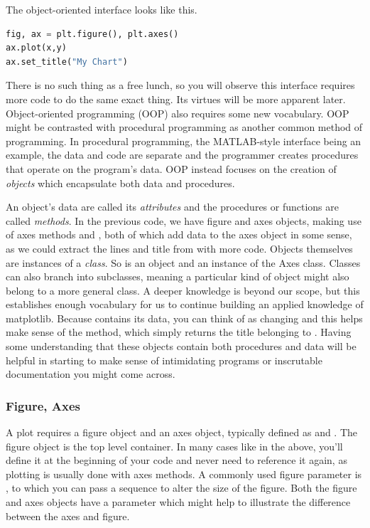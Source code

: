 The object-oriented interface looks like this. 

\begin{lstlisting}[language = Python]
fig, ax = plt.figure(), plt.axes()
ax.plot(x,y)
ax.set_title("My Chart")
\end{lstlisting}

There is no such thing as a free lunch, so you will observe this interface requires more code to do the same exact thing. Its virtues will be more apparent later. Object-oriented programming (OOP) also requires some new vocabulary. OOP might be contrasted with procedural programming as another common method of programming. In procedural programming, the MATLAB-style interface being an example, the data and code are separate and the programmer creates procedures that operate on the program's data. OOP instead focuses on the creation of \emph{objects} which encapsulate both data and procedures. 

An object's data are called its \emph{attributes} and the procedures or functions are called \emph{methods}. In the previous code, we have figure and axes objects, making use of axes methods  and , both of which add data to the axes object in some sense, as we could extract the lines and title from  with more code. Objects themselves are instances of a \emph{class}. So  is an object and an instance of the Axes class. Classes can also branch into subclasses, meaning a particular kind of object might also belong to a more general class. A deeper knowledge is beyond our scope, but this establishes enough vocabulary for us to continue building an applied knowledge of matplotlib. Because  contains its data, you can think of  as changing  and this helps make sense of the  method, which simply returns the title belonging to . Having some understanding that these objects contain both procedures and data will be helpful in starting to make sense of intimidating programs or inscrutable documentation you might come across.  %

\subsubsection{Figure, Axes}

A plot requires a figure object and an axes object, typically defined as  and . The figure object is the top level container. In many cases like in the above, you'll define it at the beginning of your code and never need to reference it again, as plotting is usually done with axes methods. A commonly used figure parameter is , to which you can pass a sequence to alter the size of the figure. Both the figure and axes objects have a  parameter which might help to illustrate the difference between the axes and figure. 

